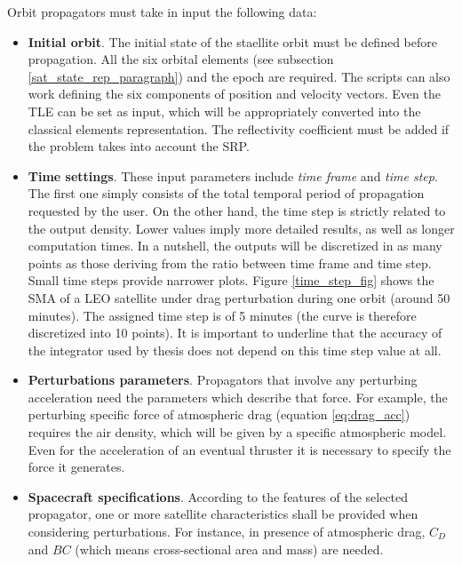 Orbit propagators must take in input the following data:
\begin{itemize}
    \item \textbf{Initial orbit}. The initial state of the staellite orbit must be defined before propagation.
          All the six orbital elements (see subsection \ref{sat_state_rep_paragraph}) and the epoch are required. 
          The scripts can also work defining the six components of position and velocity vectors.
          Even the TLE can be set as input, which will be appropriately converted into the classical elements representation.  
          The reflectivity coefficient must be added if the problem takes into account the SRP.
    \item \textbf{Time settings}. These input parameters include \textit{time frame} and \textit{time step}.
          The first one simply consists of the total temporal period of propagation requested by the user.
          On the other hand, the time step is strictly related to the output density.
          Lower values imply more detailed results, as well as longer computation times.
          In a nutshell, the outputs will be discretized in as many points as those deriving from the ratio between time frame and time step.
          Small time steps provide narrower plots. 
          Figure \ref{time_step_fig} shows the SMA of a LEO satellite under drag perturbation during one orbit (around 50 minutes). 
          The assigned time step is of 5 minutes (the curve is therefore discretized into 10 points).
          It is important to underline that the accuracy of the integrator used by thesis does not depend on this time step value at all.
    \item \textbf{Perturbations parameters}. Propagators that involve any perturbing acceleration need the parameters which describe that force. 
          For example, the perturbing specific force of atmospheric drag (equation \ref{eq:drag_acc}) requires the air density, which will be given by a specific atmospheric model.
          Even for the acceleration of an eventual thruster it is necessary to specify the force it generates.
    \item \textbf{Spacecraft specifications}. According to the features of the selected propagator, one or more satellite characteristics shall be provided when considering perturbations.
          For instance, in presence of atmospheric drag, $C_D$ and $BC$ (which means cross-sectional area and mass) are needed. 


\end{itemize}
